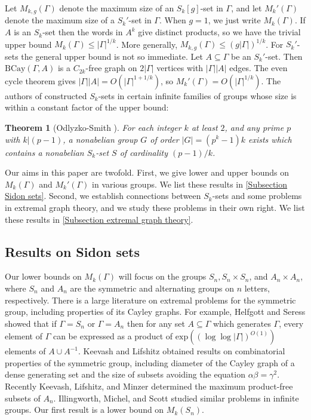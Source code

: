 \documentclass[12pt]{article}
\newtheorem{thm}{Theorem}
\begin{document}
Let $M_{k,g}(\Gamma)$ denote the maximum size of an $S_k[g]$-set in $\Gamma$, and let $M_k'(\Gamma)$ denote the maximum size of a $S_k'$-set in $\Gamma$. When $g=1$, we just write $M_k(\Gamma)$. If $A$ is an $S_k$-set then the words in $A^k$ give distinct products, so we have the trivial upper bound $M_k(\Gamma)\le|\Gamma|^{1/k}$. More generally, $M_{k,g}(\Gamma)\le (g|\Gamma|)^{1/k}$. For $S_k'$-sets the general upper bound is not so immediate. Let $A\subseteq\Gamma$ be an $S_k'$-set. Then $\mathrm{BCay}(\Gamma,A)$ is a $C_{2k}$-free graph on $2|\Gamma|$ vertices with $|\Gamma||A|$ edges. The even cycle theorem \cite{bondy1974cycles} gives $|\Gamma||A|=O(|\Gamma|^{1+1/k})$, so $M_k'(\Gamma)=O(|\Gamma|^{1/k})$. The authors of \cite{odlyzko1995nonabelian} constructed $S_k$-sets in certain infinite families of groups whose size is within a constant factor of the upper bound:

\begin{thm}[Odlyzko-Smith \cite{odlyzko1995nonabelian}] \label{Odlyzko result}
For each integer $k$ at least $2$, and any prime $p$ with $k|(p-1)$, a nonabelian group $G$ of order $|G|=(p^k-1)k$ exists which contains a nonabelian $S_k$-set $S$ of cardinality $(p-1)/k$.
\end{thm}

Our aims in this paper are twofold. First, we give lower and upper bounds on $M_k(\Gamma)$ and $M_k'(\Gamma)$ in various groups. We list these results in \autoref{Subsection Sidon sets}. Second, we establish connections between $S_k$-sets and some problems in extremal graph theory, and we study these problems in their own right. We list these results in \autoref{Subsection extremal graph theory}.

\subsection{Results on Sidon sets} \label{Subsection Sidon sets}

Our lower bounds on $M_k(\Gamma)$ will focus on the groups $S_n,S_n\times S_n$, and $A_n\times A_n$, where $S_n$ and $A_n$ are the symmetric and alternating groups on $n$ letters, respectively. There is a large literature on extremal problems for the symmetric group, including properties of its Cayley graphs. For example, Helfgott and Seress \cite{helfgott2014diameter} showed that if $\Gamma=S_n$ or $\Gamma=A_n$ then for any set $A\subseteq\Gamma$ which generates $\Gamma$, every element of $\Gamma$ can be expressed as a product of $\mathrm{exp}((\log\log|\Gamma|)^{O(1)})$ elements of $A\cup A^{-1}$. Keevash and Lifshitz \cite{KL} obtained results on combinatorial properties of the symmetric group, including diameter of the Cayley graph of a dense generating set and the size of subsets avoiding the equation $\alpha\beta=\gamma^2$. Recently Keevash, Lifshitz, and Minzer \cite{KLM} determined the maximum product-free subsets of $A_n$. Illingworth, Michel, and Scott \cite{IMS} studied similar problems in infinite groups. Our first result is a lower bound on $M_k(S_n)$.
\end{document}
